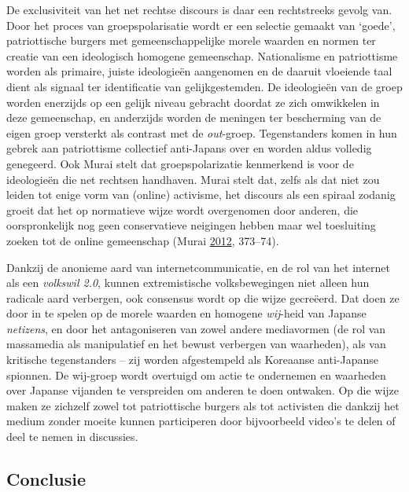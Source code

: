 \documentclass[10.5pt,dutch,]{article}
\begin{document}
De exclusiviteit van het net rechtse discours is daar een rechtstreeks
gevolg van. Door het proces van groepspolarisatie wordt er een selectie
gemaakt van `goede', patriottische burgers met gemeenschappelijke morele
waarden en normen ter creatie van een ideologisch homogene gemeenschap.
Nationalisme en patriottisme worden als primaire, juiste ideologieën
aangenomen en de daaruit vloeiende taal dient als signaal ter
identificatie van gelijkgestemden. De ideologieën van de groep worden
enerzijds op een gelijk niveau gebracht doordat ze zich omwikkelen in
deze gemeenschap, en anderzijds worden de meningen ter bescherming van
de eigen groep versterkt als contrast met de \emph{out}-groep.
Tegenstanders komen in hun gebrek aan patriottisme collectief
anti-Japans over en worden aldus volledig genegeerd. Ook Murai stelt dat
groepspolarizatie kenmerkend is voor de ideologieën die net rechtsen
handhaven. Murai stelt dat, zelfs als dat niet zou leiden tot enige vorm
van (online) activisme, het discours als een spiraal zodanig groeit dat
het op normatieve wijze wordt overgenomen door anderen, die
oorspronkelijk nog geen conservatieve neigingen hebben maar wel
toesluiting zoeken tot de online gemeenschap (Murai
\protect\hyperlink{ref-muraiux5fnetux5f2012}{2012}, 373--74).

Dankzij de anonieme aard van internetcommunicatie, en de rol van het
internet als een \emph{volkswil 2.0}, kunnen extremistische
volksbewegingen niet alleen hun radicale aard verbergen, ook consensus
wordt op die wijze gecreëerd. Dat doen ze door in te spelen op de morele
waarden en homogene \emph{wij}-heid van Japanse \emph{netizens}, en door
het antagoniseren van zowel andere mediavormen (de rol van massamedia
als manipulatief en het bewust verbergen van waarheden), als van
kritische tegenstanders -- zij worden afgestempeld als Koreaanse
anti-Japanse spionnen. De wij-groep wordt overtuigd om actie te
ondernemen en waarheden over Japanse vijanden te verspreiden om anderen
te doen ontwaken. Op die wijze maken ze zichzelf zowel tot patriottische
burgers als tot activisten die dankzij het medium zonder moeite kunnen
participeren door bijvoorbeeld video's te delen of deel te nemen in
discussies.

\subsection{Conclusie}\label{conclusie}
\end{document}
